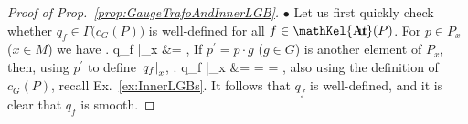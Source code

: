 \documentclass[a4paper,oneside,11pt,bibliography=totoc]{scrartcl}
\DeclareMathOperator{\sAut}{\mathKel{A\mkern-5.5mu u\mkern-4mu t\mkern-1.5mu}}
\def\bas#1\eas{\begin{align*}#1\end{align*}}
\theoremstyle{plain}
\theoremstyle{remark}
\theoremstyle{definition}
\begin{document}
\begin{proof}[Proof of Prop.\ \ref{prop:GaugeTrafoAndInnerLGB}]
\leavevmode\newline
\indent $\bullet$ Let us first quickly check whether $q_f \in \Gamma\bigl( c_G(P) \bigr)$ is well-defined for all $f \in \sAut(P)$. For $p \in P_x$ ($x \in M$) we have
\bas
\mleft. q_f \mright|_x
&=
,
\eas
If $p^\prime = p \cdot g$ ($g \in G$) is another element of $P_x$, then, using $p^\prime$ to define $\mleft. q_f \mright|_x$,
\bas
\mleft. q_f \mright|_x
&=
=
=
,
\eas
also using the definition of $c_G(P)$, recall Ex.\ \ref{ex:InnerLGBs}. It follows that $q_f$ is well-defined, and it is clear that $q_f$ is smooth.


\end{proof}
\end{document}
